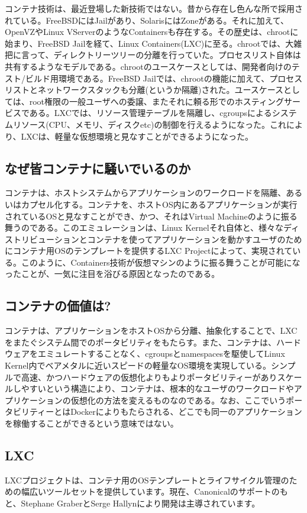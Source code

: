 ﻿\documentclass[9pt,b5paper,tombo,openany]{jsbook}
\begin{document}
コンテナ技術は、最近登場した新技術ではない。昔から存在し色んな所で採用されている。FreeBSDにはJailがあり、SolarisにはZoneがある。それに加えて、OpenVZやLinux VServerのようなContainersも存在する。その歴史は、chrootに始まり、FreeBSD Jailを経て、Linux Containers(LXC)に至る。chrootでは、大雑把に言って、ディレクトリーツリーの分離を行っていた。プロセスリスト自体は共有するようなモデルである。chrootのユースケースとしては、開発者向けのテスト/ビルド用環境である。FreeBSD Jailでは、chrootの機能に加えて、プロセスリストとネットワークスタックも分離(というか隔離)された。ユースケースとしては、root権限の一般ユーザへの委譲、またそれに頼る形でのホスティングサービスである。LXCでは、リソース管理テーブルを隔離し、cgroupsによるシステムリソース(CPU、メモリ、ディスクetc)の制御を行えるようになった。これにより、LXCは、軽量な仮想環境と見なすことができるようになった。

\newpage

\subsection{なぜ皆コンテナに騒いでいるのか}
コンテナは、ホストシステムからアプリケーションのワークロードを隔離、あるいはカプセル化する。コンテナを、ホストOS内にあるアプリケーションが実行されているOSと見なすことができ、かつ、それはVirtual Machineのように振る舞うのである。このエミュレーションは、Linux Kernelそれ自体と、様々なディストリビューションとコンテナを使ってアプリケーションを動かすユーザのためにコンテナ用OSのテンプレートを提供するLXC Projectによって、実現されている。このように、Containers技術が仮想マシンのように振る舞うことが可能になったことが、一気に注目を浴びる原因となったのである。

\subsection{コンテナの価値は?}
コンテナは、アプリケーションをホストOSから分離、抽象化することで、LXCをまたぐシステム間でのポータビリティをもたらす。また、コンテナは、ハードウェアをエミュレートすることなく、cgroupsとnamespacesを駆使してLinux Kernel内でベアメタルに近いスピードの軽量なOS環境を実現している。シンプルで高速、かつハードウェアの仮想化よりもよりポータビリティーがありスケールしやすいという構造により、コンテナは、根本的なユーザのワークロードやアプリケーションの仮想化の方法を変えるものなのである。なお、ここでいうポータビリティーとはDockerによりもたらされる、どこでも同一のアプリケーションを稼働することができるという意味ではない。

\subsection{LXC}
LXCプロジェクトは、コンテナ用のOSテンプレートとライフサイクル管理のための幅広いツールセットを提供しています。現在、Canonicalのサポートのもと、Stephane GraberとSerge Hallynにより開発は主導されています。
\end{document}

